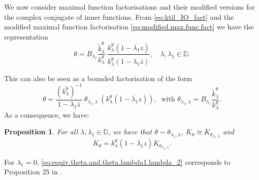 \documentclass[12pt]{elsarticle}
\numberwithin{equation}{section}
\theoremstyle{plain}
\newtheorem{prop}[thm]{Proposition}
\newcommand{\DD}{\ensuremath{\mathbb{D}}}
\newcommand{\ol}[1]{\ensuremath{\overline{#1}}}
\newcommand{\kktil}{\ensuremath{\tilde k^\theta_\lambda}}
\newcommand{\kk}{\ensuremath{k^\theta_\lambda}}
\begin{document}
We now consider maximal function factorisations and their modified versions for the complex conjugate of inner functions.
From \eqref{eq:ktil_IO_fact} and the modified maximal function factorisation \eqref{eq:modified.max.func.fact} we have the representation
\begin{equation*}
\theta = B_{\lambda_1} \frac{\kktil}{\kk}\ \frac{\kk (1-\ol{\lambda_1} z)}{\ol\kk (1 - \lambda_1 \ol z)}, \quad \lambda,\lambda_1 \in\DD.
\end{equation*}

This can also be seen as a bounded factorisation of the form
\begin{equation*}
\theta = \frac{(\ol\kk)^{-1}}{1- \lambda_1 \ol z}\ \theta_{\lambda_1,\lambda}\ (\kk (1 - \ol{\lambda_1} z)),\ \text{ with } \theta_{\lambda_1,\lambda} = B_{\lambda_1} \frac{\kktil}{\kk}.
\end{equation*}
As a consequence, we have:


\begin{prop}
\label{prop:equiv.theta.and.theta.lambda1.lambda}
For all $\lambda,\lambda_1 \in\DD$, we have that $\theta \sim \theta_{\lambda_1,\lambda}$, $K_\theta \cong K_{\theta_{\lambda_1,\lambda}}$ and
\begin{equation}
\label{eq:equiv.theta.and.theta.lambda1.lambda_2}
K_\theta = \kk (1 - \ol{\lambda_1} z) K_{\theta_{\lambda_1,\lambda}}.
\end{equation}
\end{prop}


For $\lambda_1 = 0$, \eqref{eq:equiv.theta.and.theta.lambda1.lambda_2} corresponds to Proposition 25 in \cite{Cro94}.
\end{document}
